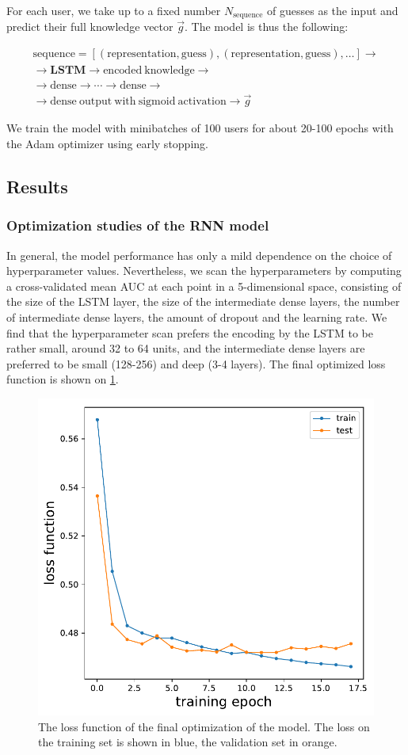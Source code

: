 For each user, we take up to a fixed number $N_{\mathrm{sequence}}$ of guesses as the input and predict their full knowledge vector $\vec{g}$. The model is thus the following:

\begin{gather*}
\mathrm{sequence} = [(\mathrm{representation}, \mathrm{guess}), (\mathrm{representation}, \mathrm{guess}), \dots] \rightarrow \\
\rightarrow \mathbf{LSTM} \rightarrow \mathrm{encoded\ knowledge} \rightarrow \\ \rightarrow \mathrm{dense} \rightarrow \cdots \rightarrow \mathrm{dense} \rightarrow \\
\rightarrow \mathrm{dense\ output\ with\ sigmoid\ activation} \rightarrow \vec{g} 
\end{gather*}

We train the model with minibatches of 100 users for about 20-100 epochs with the Adam optimizer using early stopping.

\subsection{Results}

\subsubsection{Optimization studies of the RNN model}

In general, the model performance has only a mild dependence on the choice of hyperparameter values. Nevertheless, we scan the hyperparameters by computing a cross-validated mean AUC at each point in a 5-dimensional space, consisting of the size of the LSTM layer, the size of the intermediate dense layers, the number of intermediate dense layers, the amount of dropout and the learning rate. We find that the hyperparameter scan prefers the encoding by the LSTM to be rather small, around 32 to 64 units, and the intermediate dense layers are preferred to be small (128-256) and deep (3-4 layers). The final optimized loss function is shown on \cref{fig:loss}.

\begin{figure}[ht]
\centering
\includegraphics[width=0.5\linewidth]{figures/lingvist/loss.pdf}
\caption{The loss function of the final optimization of the model. The loss on the training set is shown in blue, the validation set in orange.} 
\label{fig:loss} 
\end{figure} 

